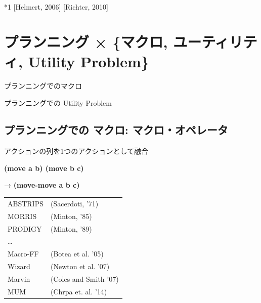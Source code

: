 \begin{note}
*1 [Helmert, 2006] [Richter, 2010]
\end{note}

\section{プランニング × \{マクロ, ユーティリティ, Utility Problem\}}
\label{sec-6}

プランニングでのマクロ

プランニングでの Utility Problem

\subsection{プランニングでの マクロ: マクロ・オペレータ}
\label{sec-6-1}


\begin{container-fluid}
\begin{row-fluid}
\begin{span6}
\begin{larger}
\begin{center}
アクションの列を1つのアクションとして融合

\textbf{(move a b) (move b c)}
\end{center}

\begin{alignright}
→ \textbf{(move-move a b c)}
\end{alignright}
\end{larger}
\end{span6}
\begin{span6}
\begin{center}
\begin{tabular}{ll}
ABSTRIPS & (Sacerdoti, '71)\\
MORRIS & (Minton, '85)\\
PRODIGY & (Minton, '89)\\
\ldots{} & \\
Macro-FF & (Botea et al. '05)\\
Wizard & (Newton et al. '07)\\
Marvin & (Coles and Smith '07)\\
MUM & (Chrpa et. al. '14)\\
\end{tabular}
\end{center}
\end{span6}
\end{row-fluid}
\end{container-fluid}


